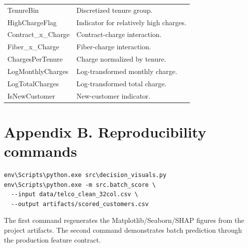 \documentclass[9pt]{article}
\begin{document}
\begin{longtable}{p{}p{}}
TenureBin & Discretized tenure group.\\
HighChargeFlag & Indicator for relatively high charges.\\
Contract\_x\_Charge & Contract-charge interaction.\\
Fiber\_x\_Charge & Fiber-charge interaction.\\
ChargesPerTenure & Charge normalized by tenure.\\
LogMonthlyCharges & Log-transformed monthly charge.\\
LogTotalCharges & Log-transformed total charge.\\
IsNewCustomer & New-customer indicator.\\
\end{longtable}

\section*{Appendix B. Reproducibility commands}
\begin{verbatim}
env\Scripts\python.exe src\decision_visuals.py
env\Scripts\python.exe -m src.batch_score \
  --input data/telco_clean_32col.csv \
  --output artifacts/scored_customers.csv
\end{verbatim}
The first command regenerates the Matplotlib/Seaborn/SHAP figures from the project artifacts. The second command demonstrates batch prediction through the production feature contract.
\end{document}
